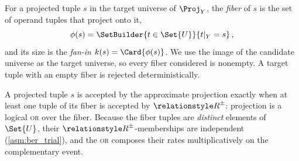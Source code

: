\documentclass[ ../main.tex]{subfiles}
\begin{document}
\begin{definition}[Fiber]
\label{def:fiber}
For a projected tuple $s$ in the target universe of $\Proj_Y$, the \emph{fiber}
of $s$ is the set of operand tuples that project onto it,
\begin{equation}
    \fiber(s) = \SetBuilder{t \in \Set{U}}{ t|_Y = s }\,,
\end{equation}
and its size is the \emph{fan-in} $k(s) = \Card{\fiber(s)}$. We use the image
of the candidate universe as the target universe, so every fiber considered is
nonempty. A target tuple with an empty fiber is rejected deterministically.
\end{definition}

A projected tuple $s$ is accepted by the approximate projection exactly when at
least one tuple of its fiber is accepted by $\ARelation{R}$: projection is a
logical \textsc{or} over the fiber. Because the fiber tuples are \emph{distinct}
elements of $\Set{U}$, their $\ARelation{R}$-memberships are independent
(\cref{asm:ber_trial}), and the \textsc{or} composes their rates multiplicatively
on the complementary event.
\end{document}
